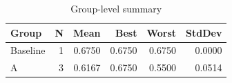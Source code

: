 \begin{table}[htbp]
\centering
\caption{Group-level summary}
\label{tab:group-summary}
\begin{tabular}{lrrrrr}
\toprule
\textbf{Group} & \textbf{N} & \textbf{Mean} & \textbf{Best} & \textbf{Worst} & \textbf{StdDev} \\
\midrule
Baseline & 1 & 0.6750 & 0.6750 & 0.6750 & 0.0000 \\
A & 3 & 0.6167 & 0.6750 & 0.5500 & 0.0514 \\
\bottomrule
\end{tabular}
\end{table}